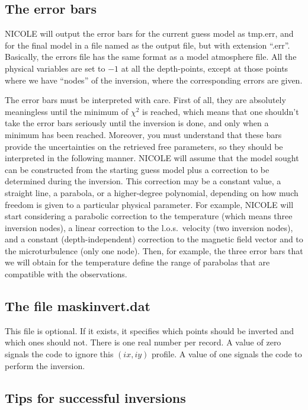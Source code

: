 \subsection{The error bars}
\label{errorbars}

NICOLE will output the error bars for the current guess model as tmp.err, 
and for the final model in a file named as the output file, 
but with extension ``.err''. Basically, the errors file
has the same format as a model atmosphere file. 
All the physical variables are set to $-1$ at all the depth-points, 
except at those points where we have ``nodes''
of the inversion, where the corresponding errors are given.

The error bars must be interpreted with care. First of all, they are
absolutely meaningless until the minimum of $\chi^2$ is reached, which
means that one shouldn't take the error bars seriously until the
inversion is done, and only when a minimum has been reached. Moreover,
you must understand that these bars provide the uncertainties on the
retrieved free parameters, so they should be interpreted in the
following manner. NICOLE will assume that the model sought can be
constructed from the starting guess model plus a correction to be
determined during the inversion. This correction may be a constant
value, a straight line, a parabola, or a higher-degree polynomial,
depending on how much freedom is given to a particular physical
parameter. For example, NICOLE will start considering a parabolic
correction to the temperature (which means three inversion nodes), a
linear correction to the l.o.s.\ velocity (two inversion nodes), and a
constant (depth-independent) correction to the magnetic field vector
and to the microturbulence (only one node). Then, for example, the
three error bars that we will obtain for the temperature define the
range of parabolas that are compatible with the observations.


\subsection{The file maskinvert.dat}

This file is optional. If it exists, it specifies which points should
be inverted and which ones should not. There is one real number per
record. A value of zero signals the code to ignore this $(ix, iy)$
profile. A value of one signals the code to perform the inversion.


\subsection{Tips for successful inversions}
\label{sec:tips}

